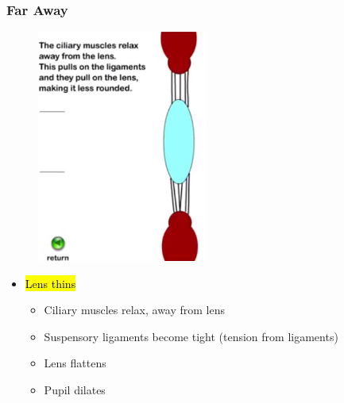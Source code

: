 \documentclass[a4paper,12pt]{article}
\begin{document}
\subsubsection{Far Away}
\begin{figure}[H]
    \centering
    \includegraphics[width=0.50\textwidth]{far}
\end{figure}
\begin{itemize}
    \item{
            \hl{Lens thins}
            \begin{itemize}
                \item{Ciliary muscles relax, away from lens}
                \item{Suspensory ligaments become tight (tension from ligaments)}
                \item{Lens flattens}
                \item{Pupil dilates}
            \end{itemize}
        }
\end{itemize}
\end{document}
